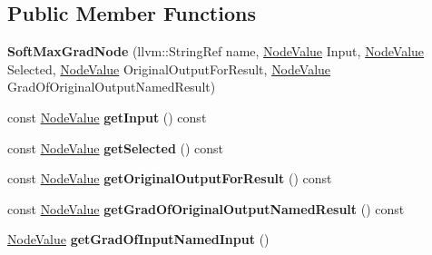\subsection*{Public Member Functions}
\begin{DoxyCompactItemize}
\item 
\mbox{\label{classglow_1_1_soft_max_grad_node_ad1b70defb9471fc4752651a2f1cad2b6}} 
{\bfseries Soft\+Max\+Grad\+Node} (llvm\+::\+String\+Ref name, \hyperlink{structglow_1_1_node_value}{Node\+Value} Input, \hyperlink{structglow_1_1_node_value}{Node\+Value} Selected, \hyperlink{structglow_1_1_node_value}{Node\+Value} Original\+Output\+For\+Result, \hyperlink{structglow_1_1_node_value}{Node\+Value} Grad\+Of\+Original\+Output\+Named\+Result)
\item 
\mbox{\label{classglow_1_1_soft_max_grad_node_ac3ad1d7cd52d5050d9e24d4a4d459d86}} 
const \hyperlink{structglow_1_1_node_value}{Node\+Value} {\bfseries get\+Input} () const
\item 
\mbox{\label{classglow_1_1_soft_max_grad_node_ad913ae4e277c61252814e3eb1db480d1}} 
const \hyperlink{structglow_1_1_node_value}{Node\+Value} {\bfseries get\+Selected} () const
\item 
\mbox{\label{classglow_1_1_soft_max_grad_node_a9f0f8c103eee86f37116e52dd9604ac6}} 
const \hyperlink{structglow_1_1_node_value}{Node\+Value} {\bfseries get\+Original\+Output\+For\+Result} () const
\item 
\mbox{\label{classglow_1_1_soft_max_grad_node_a6d8b45dbc9ad5f7bb69096e31a680353}} 
const \hyperlink{structglow_1_1_node_value}{Node\+Value} {\bfseries get\+Grad\+Of\+Original\+Output\+Named\+Result} () const
\item 
\mbox{\label{classglow_1_1_soft_max_grad_node_afaaa8ba59917dc00f8bbee78e97a6034}} 
\hyperlink{structglow_1_1_node_value}{Node\+Value} {\bfseries get\+Grad\+Of\+Input\+Named\+Input} ()
\item 
\mbox{\label{classglow_1_1_soft_max_grad_node_a6f68a536282c7a011119558ef11df624}} 

\end{DoxyCompactItemize}

